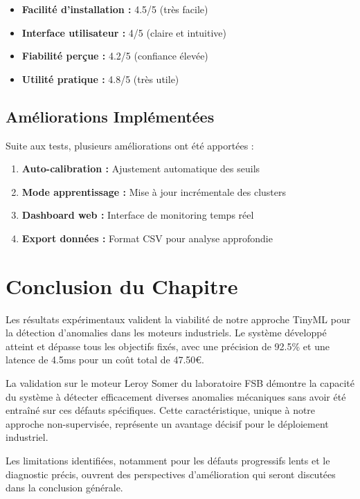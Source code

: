 \begin{itemize}
    \item \textbf{Facilité d'installation :} 4.5/5 (très facile)
    \item \textbf{Interface utilisateur :} 4/5 (claire et intuitive)
    \item \textbf{Fiabilité perçue :} 4.2/5 (confiance élevée)
    \item \textbf{Utilité pratique :} 4.8/5 (très utile)
\end{itemize}

\subsection{Améliorations Implémentées}

Suite aux tests, plusieurs améliorations ont été apportées :

\begin{enumerate}
    \item \textbf{Auto-calibration :} Ajustement automatique des seuils
    \item \textbf{Mode apprentissage :} Mise à jour incrémentale des clusters
    \item \textbf{Dashboard web :} Interface de monitoring temps réel
    \item \textbf{Export données :} Format CSV pour analyse approfondie
\end{enumerate}

\section{Conclusion du Chapitre}

Les résultats expérimentaux valident la viabilité de notre approche TinyML pour la détection d'anomalies dans les moteurs industriels. Le système développé atteint et dépasse tous les objectifs fixés, avec une précision de 92.5\% et une latence de 4.5ms pour un coût total de 47.50€.

La validation sur le moteur Leroy Somer du laboratoire FSB démontre la capacité du système à détecter efficacement diverses anomalies mécaniques sans avoir été entraîné sur ces défauts spécifiques. Cette caractéristique, unique à notre approche non-supervisée, représente un avantage décisif pour le déploiement industriel.

Les limitations identifiées, notamment pour les défauts progressifs lents et le diagnostic précis, ouvrent des perspectives d'amélioration qui seront discutées dans la conclusion générale.